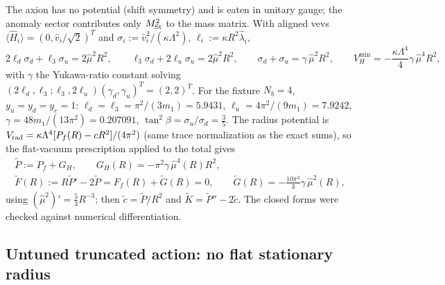 \documentclass[11pt,letterpaper]{article}
\newcommand{\Lam}{\Lambda}
\newcommand{\hmu}{\hat\mu}
\begin{document}
The axion has no potential (shift symmetry) and is eaten in unitary gauge; the anomaly sector contributes only $M_{\rm St}^2$ to the mass matrix. With aligned vevs $\langle\hat H_i\rangle=(0,\hat v_i/\sqrt2)^{T}$ and $\sigma_i:=\hat v_i^2/(\kappa\Lam^2)$, $\ell_i:=\kappa R^2\hat\lambda_i$,
\begin{equation}
2\ell_d\sigma_d+\ell_3\sigma_u=2\hmu^2R^2,\qquad \ell_3\sigma_d+2\ell_u\sigma_u=2\hmu^2R^2,\qquad
\sigma_d+\sigma_u=\gamma\,\hmu^2R^2,\qquad V_H^{\min}=-\frac{\kappa\Lam^4}4\gamma\,\hmu^4R^2,
\end{equation}
with $\gamma$ the Yukawa-ratio constant solving $(2\ell_d,\ell_3;\ell_3,2\ell_u)(\gamma_d,\gamma_u)^{T}=(2,2)^{T}$. For the fixture $N_b=4$, $y_u=y_d=y_e=1$: $\ell_d=\ell_3=\pi^2/(3m_1)=5.9431$, $\ell_u=4\pi^2/(9m_1)=7.9242$, $\gamma=48m_1/(13\pi^2)=0.207091$, $\tan^2\beta=\sigma_u/\sigma_d=\tfrac35$. The radius potential is $V_{\rm rad}=\kappa\Lam^4[P_f(R)-cR^2]/(4\pi^2)$ (same trace normalization as the exact sums), so the flat-vacuum prescription applied to the total gives
\begin{gather}
\tilde P:=P_f+G_H,\qquad G_H(R)=-\pi^2\gamma\,\hmu^4(R)R^2,\nonumber\\
\tilde F(R):=R\tilde P'-2\tilde P=F_f(R)+\tilde G(R)=0,\qquad \tilde G(R)=-\frac{10\pi^2}3\gamma\,\hmu^2(R),
\label{eq:coupled}
\end{gather}
using $(\hmu^2)'=\tfrac53R^{-3}$; then $\tilde c=\tilde P/R^2$ and $\tilde K=\tilde P''-2\tilde c$. The closed forms were checked against numerical differentiation.

\subsection{Untuned truncated action: no flat stationary radius}
\end{document}
